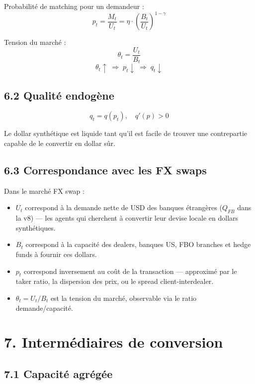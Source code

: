 Probabilité de matching pour un demandeur :
\begin{equation}
p_t = \frac{M_t}{U_t} = \eta \cdot \left(\frac{B_t}{U_t}\right)^{1-\gamma}
\label{eq:match-prob}
\end{equation}

Tension du marché :
\[
\theta_t = \frac{U_t}{B_t}
\]
\[
\theta_t \uparrow \;\Rightarrow\; p_t \downarrow \;\Rightarrow\; q_t \downarrow
\]

\subsection*{6.2 Qualité endogène}

\begin{equation}
q_t = q(p_t), \quad q'(p) > 0
\label{eq:quality}
\end{equation}

Le dollar synthétique est liquide tant qu'il est facile de
trouver une contrepartie capable de le convertir en dollar sûr.

\subsection*{6.3 Correspondance avec les FX swaps}

Dans le marché FX swap :
\begin{itemize}
  \item \textbf{$U_t$} correspond à la demande nette de USD des banques étrangères
    ($Q_{FB}$ dans la v8) — les agents qui cherchent à convertir leur
    devise locale en dollars synthétiques.
  \item \textbf{$B_t$} correspond à la capacité des dealers, banques US, FBO
    branches et hedge funds à fournir ces dollars.
  \item \textbf{$p_t$} correspond inversement au coût de la transaction —
    approximé par le taker ratio, la dispersion des prix, ou le
    spread client-interdealer.
  \item \textbf{$\theta_t = U_t/B_t$} est la tension du marché, observable via le
    ratio demande/capacité.
\end{itemize}

\section*{7. Intermédiaires de conversion}

\subsection*{7.1 Capacité agrégée}

